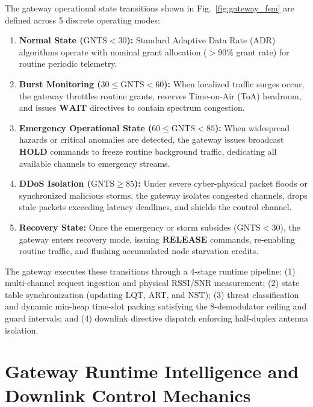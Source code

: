 \documentclass[preprint,review,12pt]{elsarticle}
\begin{document}
The gateway operational state transitions shown in Fig.~\ref{fig:gateway_fsm} are defined across 5 discrete operating modes:
\begin{enumerate}
    \item \textbf{Normal State ($\text{GNTS} < 30$):} Standard Adaptive Data Rate (ADR) algorithms operate with nominal grant allocation ($>90\%$ grant rate) for routine periodic telemetry.
    \item \textbf{Burst Monitoring ($30 \le \text{GNTS} < 60$):} When localized traffic surges occur, the gateway throttles routine grants, reserves Time-on-Air (ToA) headroom, and issues $\textbf{WAIT}$ directives to contain spectrum congestion.
    \item \textbf{Emergency Operational State ($60 \le \text{GNTS} < 85$):} When widespread hazards or critical anomalies are detected, the gateway issues broadcast $\textbf{HOLD}$ commands to freeze routine background traffic, dedicating all available channels to emergency streams.
    \item \textbf{DDoS Isolation ($\text{GNTS} \ge 85$):} Under severe cyber-physical packet floods or synchronized malicious storms, the gateway isolates congested channels, drops stale packets exceeding latency deadlines, and shields the control channel.
    \item \textbf{Recovery State:} Once the emergency or storm subsides ($\text{GNTS} < 30$), the gateway enters recovery mode, issuing $\textbf{RELEASE}$ commands, re-enabling routine traffic, and flushing accumulated node starvation credits.
\end{enumerate}

The gateway executes these transitions through a 4-stage runtime pipeline: (1) multi-channel request ingestion and physical RSSI/SNR measurement; (2) state table synchronization (updating LQT, ART, and NST); (3) threat classification and dynamic min-heap time-slot packing satisfying the 8-demodulator ceiling and guard intervals; and (4) downlink directive dispatch enforcing half-duplex antenna isolation.




\section{Gateway Runtime Intelligence and Downlink Control Mechanics}
\end{document}
